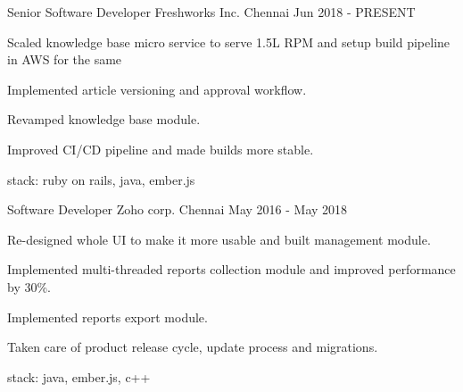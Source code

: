 
\begin{cventries}
  \cventry
    {Senior Software Developer} %
    {Freshworks Inc.} %
    {Chennai} %
    {Jun 2018 - PRESENT} %
    {
      \begin{cvitems} %
        \item {Scaled knowledge base micro service to serve 1.5L RPM and setup build pipeline in AWS for the same}
        \item {Implemented article versioning and approval workflow.}
        \item {Revamped knowledge base module.}
        \item {Improved CI/CD pipeline and made builds more stable.}
      \end{cvitems}
    }
    {stack: ruby on rails, java, ember.js}

  \cventry
    {Software Developer} %
    {Zoho corp.} %
    {Chennai} %
    {May 2016 - May 2018} %
    {
      \begin{cvitems} %
        \item {Re-designed whole UI to make it more usable and built management module.}
        \item {Implemented multi-threaded reports collection module and improved performance by 30\%.}
        \item {Implemented reports export module.}
        \item {Taken care of product release cycle, update process and migrations.}
      \end{cvitems}
    }
    {stack: java, ember.js, c++}    
\end{cventries}
